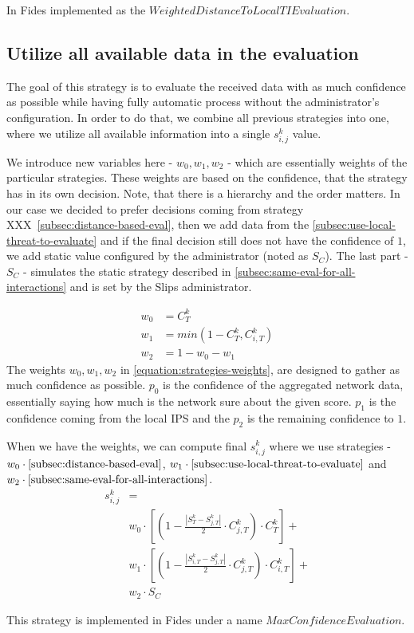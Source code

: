 \noindent
In Fides implemented as the $WeightedDistanceToLocalTIEvaluation$.

\subsection{Utilize all available data in the evaluation}
The goal of this strategy is to evaluate the received data with as much confidence as possible while having fully automatic process without the administrator's configuration.
In order to do that, we combine all previous strategies into one, where we utilize all available information into a single $s^{k}_{i, j}$ value.

We introduce new variables here - $w_{0}, w_{1}, w_{2}$ - which are essentially weights of the particular strategies. These weights are based on the confidence, that the strategy has in its own decision.
Note, that there is a hierarchy and the order matters. 
In our case we decided to prefer decisions coming from strategy XXX~\ref{subsec:distance-based-eval}, then we add data from the \ref{subsec:use-local-threat-to-evaluate} and if the final decision still does not have the confidence of $1$, we add static value configured by the administrator (noted as $S_{C}$). 
The last part - $S_{C}$ - simulates the static strategy described in \ref{subsec:same-eval-for-all-interactions} and is set by the Slips administrator.

\begin{equation}
\label{equation:strategies-weights}
\begin{split}
    w_{0} &= {C}^{k}_{T} \\
    w_{1} &= min(1 - {C}^{k}_{T}, {C}^{k}_{i, T}) \\
    w_{2} &= 1 - w_{0} - w_{1}
\end{split}
\end{equation}
The weights $w_{0}, w_{1}, w_{2}$ in \ref{equation:strategies-weights}, are designed to gather as much confidence as possible. $p_{0}$ is the confidence of the aggregated network data, essentially saying how much is the network sure about the given score. 
$p_{1}$ is the confidence coming from the local IPS and the $p_{2}$ is the remaining confidence to $1$.

When we have the weights, we can compute final $s^{k}_{i, j}$ where we use strategies - $w_{0} \cdot \ref{subsec:distance-based-eval}$, $w_{1} \cdot \ref{subsec:use-local-threat-to-evaluate}$ and $w_{2} \cdot \ref{subsec:same-eval-for-all-interactions}$. 
\begin{equation}
\begin{split}
    s^{k}_{i, j} &= \\
    &w_{0} \cdot \left[\left(1 - \frac{|{S}^{k}_{T} - S^{k}_{j, T}|}{2} \cdot C^{k}_{j, T}\right) \cdot C^{k}_{T}\right] + \\
    &w_{1} \cdot \left[\left(1 - \frac{|{S}^{k}_{i, T} - S^{k}_{j, T}|}{2} \cdot C^{k}_{j, T}\right) \cdot C^{k}_{i, T}\right] + \\
    &w_{2} \cdot S_{C}
\end{split}
\end{equation}

\noindent
This strategy is implemented in Fides under a name $MaxConfidenceEvaluation$.
